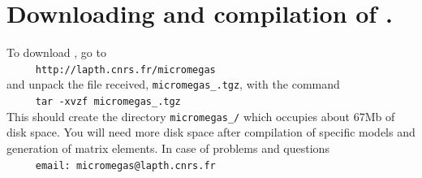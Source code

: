 \documentclass[12pt,a4paper]{article}
\begin{document}
  
\section{Downloading and compilation of \micro.}
To   download  \micro, go to    \\  
\verb|     http://lapth.cnrs.fr/micromegas|\\
and unpack the file received, \verb|micromegas_|\VERSION\verb|.tgz|, with the command\\
\verb|     tar -xvzf micromegas_|\VERSION\verb|.tgz|\\
This should create the directory \verb|micromegas_|\VERSION\verb|/| which occupies about 67Mb of disk space. You will need more disk space after compilation of
specific models and generation of matrix elements.
In case of problems and questions\\
\verb|     email: micromegas@lapth.cnrs.fr|\\
\end{document}
